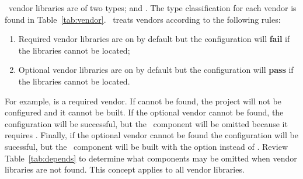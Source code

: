 \draco\ vendor libraries are of two types;  and
.  The type classification for each vendor is found in
Table~\ref{tab:vendor}.  \draco\ treats vendors according to the
following rules:
\begin{enumerate}
\item Required vendor libraries are on by default but the configuration will {\bf fail} if the libraries cannot be located;
\item Optional vendor libraries are on by default but the configuration will {\bf pass} if the libraries cannot be located.
\end{enumerate}
For example,  is a required vendor.  If  cannot be found, the project will not be configured and it cannot be built.  If the optional vendor  cannot be found, the configuration will be successful, but the \draco\ component  will be omitted because it requires .  Finally, if the optional vendor  cannot be found the configuration will be sucessful, but the \cfour\ component will be built with the  option instead of .  Review Table~\ref{tab:depends} to determine what components may be omitted when vendor libraries are not found. This concept applies to all vendor libraries.




